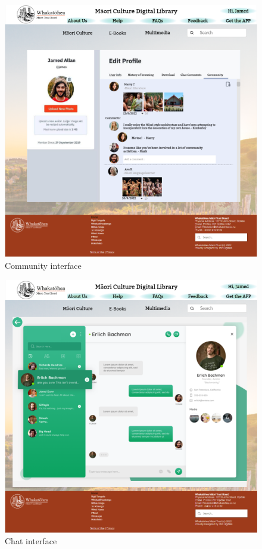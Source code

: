 \begin{figure}[htbp]
  \centerline{\includegraphics[width=400pt]{images/3-1-5.png}}
  \caption{Community interface}
  \label{fig30}
\end{figure}

\begin{figure}[htbp]
  \centerline{\includegraphics[width=400pt]{images/3-1-6.png}}
  \caption{Chat interface}
  \label{fig30}
\end{figure}

